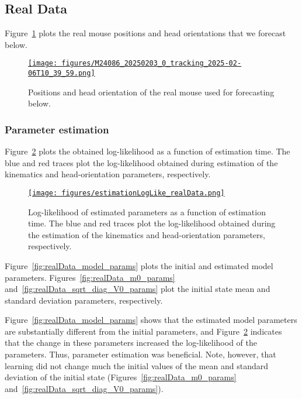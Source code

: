 \documentclass[12pt]{article}
\begin{document}
\subsection{Real Data}
\label{sec:realData}

Figure~\ref{fig:real_posAndHO} plots the real mouse positions and head
orientations that we forecast below.

\begin{figure}
    \centering
    \href{https://www.gatsby.ucl.ac.uk/~rapela/aman/reports/ekfForKinematicsAndHeadOrientation/figures/M24086_20250203_0_tracking_2025-02-06T10_39_59.html}{\texttt{[image: figures/M24086\_20250203\_0\_tracking\_2025-02-06T10\_39\_59.png]}}
    \caption{Positions and head orientation of the real mouse used for
    forecasting below.}
    \label{fig:real_posAndHO}
\end{figure}

\subsubsection*{Parameter estimation}

Figure~\ref{fig:realData_logLike} plots the obtained
log-likelihood as a function of estimation time. The blue and red traces plot the
log-likelihood obtained during estimation of the kinematics and
head-orientation parameters, respectively.

\begin{figure}
    \centering
    \href{https://www.gatsby.ucl.ac.uk/~rapela/aman/reports/ekfForKinematicsAndHeadOrientation/figures/estimationLogLike_realData.html}{\texttt{[image: figures/estimationLogLike\_realData.png]}}
    \caption{Log-likelihood of estimated parameters as a function of estimation
    time. The blue and red traces plot the log-likelihood obtained during the
    estimation of the kinematics and head-orientation parameters,
    respectively.}
    \label{fig:realData_logLike}
\end{figure}

Figure~\ref{fig:realData_model_params} plots the initial and estimated model
parameters. Figures~\ref{fig:realData_m0_params}
and~\ref{fig:realData_sqrt_diag_V0_params} plot the initial
state mean and standard deviation parameters, respectively.

Figure~\ref{fig:realData_model_params} shows that the estimated model
parameters are substantially different from the initial parameters, and
Figure~\ref{fig:realData_logLike} indicates that the change in these parameters
increased the log-likelihood of the parameters. Thus, parameter estimation was
beneficial.
%
Note, however, that learning did not change much the initial values of the
mean and standard deviation of the initial state
(Figures~\ref{fig:realData_m0_params}
and~\ref{fig:realData_sqrt_diag_V0_params}).
\end{document}
